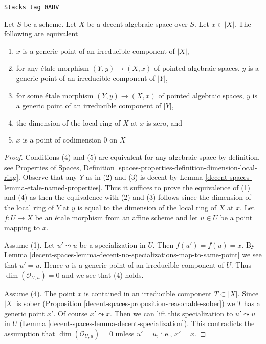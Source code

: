 \begin{lemma}
\label{decent-spaces-lemma-decent-generic-points}
\href{https://stacks.math.columbia.edu/tag/0ABV}{\texttt{Stacks tag 0ABV}}

Let $S$ be a scheme. Let $X$ be a decent algebraic space over $S$.
Let $x \in |X|$. The following are equivalent
\begin{enumerate}
\item $x$ is a generic point of an irreducible component of $|X|$,
\item for any \'etale morphism $(Y, y) \to (X, x)$ of pointed algebraic
spaces, $y$ is a generic point of an irreducible component of $|Y|$,
\item for some \'etale morphism $(Y, y) \to (X, x)$ of pointed algebraic
spaces, $y$ is a generic point of an irreducible component of $|Y|$,
\item the dimension of the local ring of $X$ at $x$ is zero, and
\item $x$ is a point of codimension $0$ on $X$
\end{enumerate}
\end{lemma}

\begin{proof}
Conditions (4) and (5) are equivalent for any algebraic space
by definition, see Properties of Spaces, Definition
\ref{spaces-properties-definition-dimension-local-ring}.
Observe that any $Y$ as in (2) and (3) is decent by
Lemma \ref{decent-spaces-lemma-etale-named-properties}.
Thus it suffices to prove the equivalence of (1) and (4)
as then the equivalence with (2) and (3) follows since the dimension
of the local ring of $Y$ at $y$ is equal to the dimension
of the local ring of $X$ at $x$.
Let $f : U \to X$ be an \'etale morphism from an affine scheme and let
$u \in U$ be a point mapping to $x$.

\medskip\noindent
Assume (1). Let $u' \leadsto u$ be a specialization in $U$.
Then $f(u') = f(u) = x$. By
Lemma \ref{decent-spaces-lemma-decent-no-specializations-map-to-same-point}
we see that $u' = u$. Hence $u$ is a generic point of an irreducible component
of $U$. Thus $\dim(\mathcal{O}_{U, u}) = 0$ and we see that (4) holds.

\medskip\noindent
Assume (4). The point $x$ is contained in an irreducible component
$T \subset |X|$. Since $|X|$ is sober
(Proposition \ref{decent-spaces-proposition-reasonable-sober})
we $T$ has a generic point $x'$. Of course $x' \leadsto x$.
Then we can lift this specialization to $u' \leadsto u$ in $U$
(Lemma \ref{decent-spaces-lemma-decent-specialization}). This contradicts the assumption
that $\dim(\mathcal{O}_{U, u}) = 0$ unless $u' = u$, i.e., $x' = x$.
\end{proof}

